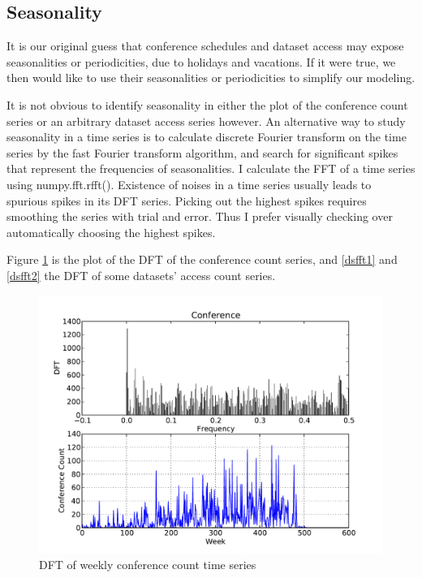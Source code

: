 \documentclass[preprint, 12pt]{elsarticle}
\begin{document}
\subsection{Seasonality}

It is our original guess that conference schedules and dataset access may expose seasonalities or periodicities, due to holidays and vacations.
If it were true, we then would like to use their seasonalities or periodicities to simplify our modeling.

It is not obvious to identify seasonality in either the plot of the conference count series  or an arbitrary dataset access series however.
An alternative way to study seasonality in a time series is to calculate discrete Fourier transform on the time series by the fast Fourier transform algorithm, and search for significant spikes that represent the frequencies of seasonalities.
I calculate the FFT of a time series using numpy.fft.rfft().
Existence of noises in a time series usually leads to spurious spikes in its DFT series. Picking out the highest spikes requires smoothing the series with trial and error.
Thus I prefer visually checking over automatically choosing the highest spikes.


Figure \ref{cffft} is the plot of the DFT of the conference count series, and  \ref{dsfft1} and \ref{dsfft2} the DFT of some datasets' access count series.

\begin{figure}
\begin{center} 
\includegraphics[scale=0.5]{../data/timeseries/datasets/conf_ct_perweek_505fft.pdf}
\end{center}
\caption{DFT of weekly conference count time series}
\label{cffft}
\end{figure}
\end{document}
